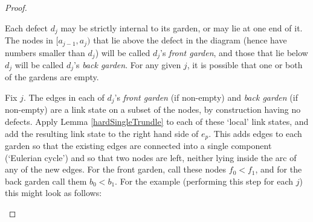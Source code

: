 \documentclass[12pt]{amsart}
\theoremstyle{plain}
\theoremstyle{definition} \newtheorem{definition}[theorem]{Definition}
\theoremstyle{plain}
\theoremstyle{plain} \newtheorem{proposition}[theorem]{Proposition}
\theoremstyle{plain} \newtheorem{conjecture}[theorem]{Conjecture}
\theoremstyle{plain} \newtheorem{corollary}[theorem]{Corollary}
\theoremstyle{remark} \newtheorem{claim}[theorem]{Claim}
\theoremstyle{remark} \newtheorem{remark}[theorem]{Remark}
\theoremstyle{remark} \newtheorem{example}[theorem]{Example}
\theoremstyle{remark} \newtheorem{comment}[theorem]{Comment}
\theoremstyle{definition} \newtheorem{question}[theorem]{Question}
\begin{document}
\begin{proof}
\begin{center}
\quad
\end{center}

Each defect $d_j$ may be strictly internal to its garden, or may lie at one end of it. The nodes in $[a_{j-1},a_j)$ that lie above the defect in the diagram (hence have numbers smaller than $d_j$) will be called $d_j$'s \emph{front garden}, and those that lie below $d_j$ will be called $d_j$'s \emph{back garden}. For any given $j$, it is possible that one or both of the gardens are empty.

Fix $j$. The edges in each of $d_j$'s \emph{front garden} (if non-empty) and \emph{back garden} (if non-empty) are a link state on a subset of the nodes, by construction having no defects. Apply Lemma \ref{hardSingleTrundle} to each of these `local' link states, and add the resulting link state to the right hand side of $e_p$. This adds edges to each garden so that the existing edges are connected into a single component (`Eulerian cycle') and so that two nodes are left, neither lying inside the arc of any of the new edges. For the front garden, call these nodes $f_0 < f_1$, and for the back garden call them $b_0 < b_1$. For the example (performing this step for each $j$) this might look as follows:

\begin{center}
\quad
\begin{tikzpicture}[x=1.5cm,y=-.5cm,baseline=-1.05cm]


\end{tikzpicture}
\end{center}
\end{proof}
\end{document}
